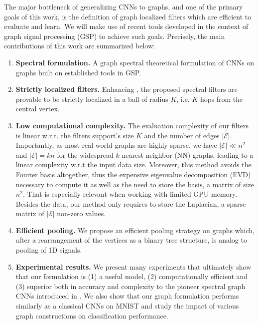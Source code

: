 \documentclass{article}
\newcommand{\E}{\mathcal{E}}
\newcommand{\bruna}{art:BrunaZarembaSzlamLeCun13DLgraphs,
art:HenaffBrunaLeCun15DLgraphs}
\begin{document}
The major bottleneck of generalizing CNNs to graphs, and one of the primary goals of
this work, is the definition of graph localized filters which are efficient to
evaluate and learn.
We will make use of recent tools developed in the context of graph signal
processing (GSP) \cite{art:ShumanNarangFrossardOrtegaVandergheynst13ReviewSPG} to achieve such goals. Precisely, the main contributions of this work are summarized below:
\begin{enumerate}
\item \textbf{Spectral formulation.} A graph spectral theoretical formulation of CNNs on graphs built on
	established tools in GSP.
\item \textbf{Strictly localized filters.} Enhancing \cite{\bruna}, the proposed spectral
	filters are provable to be strictly localized in a ball of radius $K$, i.e. $K$ hops from
	the central vertex.  
\item \textbf{Low computational complexity.} The evaluation complexity of our filters is
	linear w.r.t. the filters support's size $K$ and the number of edges $|\E|$. Importantly, as most real-world graphs are highly sparse, we have $|\E| \ll n^2$ and $|\E| = kn$ for the widespread $k$-nearest neighbor (NN) graphs, leading to a linear complexity w.r.t the input data size. Moreover,
	this method avoids the Fourier basis altogether, thus the expensive
	eigenvalue decomposition (EVD) necessary to compute it as well as the need
	to store the basis, a matrix of size $n^2$. That is especially relevant when
	working with limited GPU memory. Besides the data, our method only requires
	to store the Laplacian, a sparse matrix of $|\E|$ non-zero values.
\item \textbf{Efficient pooling.} We propose an efficient pooling strategy on
	graphs which, after a rearrangement of the vertices as a binary tree structure, is analog to pooling of
	1D signals.
\item \textbf{Experimental results.} We present many experiments that ultimately
	show that our formulation is (1) a useful model, (2) computationally
	efficient and (3) superior both in accuracy and complexity to the pioneer spectral graph CNNs introduced in \cite{\bruna}. We also show that
	our graph formulation performs similarly as a classical CNNs on MNIST and study the
	impact of various graph constructions on classification performance.
\end{enumerate}
\end{document}
